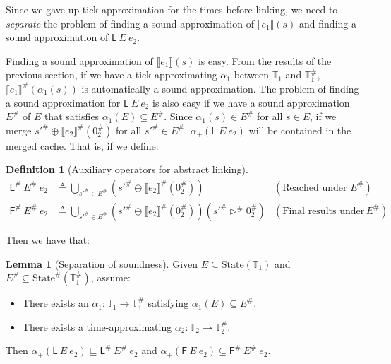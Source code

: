 \documentclass[acmsmall,review]{acmart}\settopmatter{printfolios=true,printccs=false,printacmref=false}
\theoremstyle{definition}
\newtheorem{definition}{Definition}[section]
\newtheorem{lem}{Lemma}[section]
\newcommand*{\A}[1]{{#1}^{\#}}
\newcommand*{\Time}{\mathbb{T}}
\newcommand*{\ATime}{\A{\Time}}
\newcommand*{\State}[1]{\text{State}({#1})}
\newcommand*{\AState}[1]{\A{\text{State}}({#1})}
\newcommand*{\LL}{\mathsf{L}}
\newcommand*{\sembracket}[1]{\lBrack{#1}\rBrack}
\begin{document}
Since we gave up tick-approximation for the times before linking, we need to \emph{separate} the problem of finding a sound approximation of $\sembracket{e_1}(s)$ and finding a sound approximation of $\LL\:E\:e_2$.

Finding a sound approximation of $\sembracket{e_1}(s)$ is easy.
From the results of the previous section, if we have a tick-approximating $\alpha_1$ between $\Time_1$ and $\ATime_1$, $\A{\sembracket{e_1}}(\alpha_1(s))$ is automatically a sound approximation.
The problem of finding a sound approximation for $\LL\:E\:e_2$ is also easy if we have a sound approximation $\A{E}$ of $E$ that satisfies $\alpha_1(E)\subseteq\A{E}$.
Since $\alpha_1(s)\in\A{E}$ for all $s\in E$, if we merge $\A{s'}\oplus\A{\sembracket{e_2}}(\A{0}_2)$ for all $\A{s'}\in\A{E}$, $\alpha_+(\LL\:E\:e_2)$ will be contained in the merged cache.
That is, if we define:
\begin{definition}[Auxiliary operators for abstract linking]
  \begin{align*}
    \A\LL\:\A{E}\:e_2          & \triangleq\bigcup_{\A{s'}\in \A{E}}(\A{s'}\oplus\A{\sembracket{e_2}}(\A{0}_2))                      & (\text{Reached under }\A{E})       \\
    \A{\mathsf{F}}\:\A{E}\:e_2 & \triangleq\bigcup_{\A{s'}\in \A{E}}(\A{s'}\oplus\A{\sembracket{e_2}}(\A{0}_2))(\A{s'}\A\rhd\A{0}_2) & (\text{Final results under }\A{E})
  \end{align*}
\end{definition}

Then we have that:
\begin{lem}[Separation of soundness]
  Given $E\subseteq\State{\Time_1}$ and $\A{E}\subseteq\AState{\ATime_1}$, assume:
  \begin{itemize}
    \item There exists an $\alpha_1:\Time_1\rightarrow\ATime_1$ satisfying $\alpha_1(E)\subseteq\A{E}$.
    \item There exists a time-approximating $\alpha_2:\Time_2\rightarrow\ATime_2$.
  \end{itemize}

  Then $\alpha_+(\LL\:E\:e_2)\sqsubseteq\A\LL\:\A{E}\:e_2$ and $\alpha_+(\mathsf{F}\:E\:e_2)\subseteq\A{\mathsf{F}}\:\A{E}\:e_2$.
\end{lem}
\end{document}
